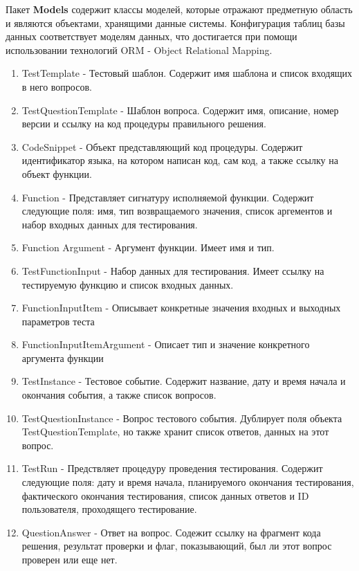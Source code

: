 \documentclass{article}
\begin{document}
    \par Пакет \textbf{Models} содержит классы моделей, которые отражают предметную область и являются объектами,
    хранящими данные системы. Конфигурация таблиц базы данных соответствует моделям данных, что достигается
    при помощи использовании технологий ORM - Object Relational Mapping.
    \begin{enumerate}
        \item TestTemplate - Тестовый шаблон. Содержит имя шаблона и список входящих 
        в него вопросов.
        \item TestQuestionTemplate - Шаблон вопроса. Содержит имя, описание,
        номер версии и ссылку на код процедуры правильного решения.
        \item CodeSnippet - Объект представляющий код процедуры. Содержит
        идентификатор языка, на котором написан код, сам код, а также ссылку
        на объект функции.
        \item Function - Представляет сигнатуру исполняемой функции. Содержит
        следующие поля: имя, тип возвращаемого значения, список аргементов и
        набор входных данных для тестирования.
        \item Function Argument - Аргумент функции. Имеет имя и тип.
        \item TestFunctionInput - Набор данных для тестирования. Имеет ссылку на
        тестируемую функцию и список входных данных.
        \item FunctionInputItem - Описывает конкретные значения входных и выходных
        параметров теста
        \item FunctionInputItemArgument - Описает тип и значение конкретного аргумента
        функции
        \item TestInstance - Тестовое событие. Содержит название, дату и время начала
        и окончания события, а также список вопросов.
        \item TestQuestionInstance - Вопрос тестового события. Дублирует поля
        объекта TestQuestionTemplate, но также хранит список ответов, данных
        на этот вопрос.
        \item TestRun - Предствляет процедуру проведения тестирования.
        Содержит следующие поля: дату и время начала, планируемого окончания
        тестирования, фактического окончания тестирования, список данных ответов и
        ID пользователя, проходящего тестирование.
        \item QuestionAnswer - Ответ на вопрос. Содежит ссылку на фрагмент кода
        решения, результат проверки и флаг, показывающий, был ли этот вопрос
        проверен или еще нет.
    \end{enumerate}
\end{document}
